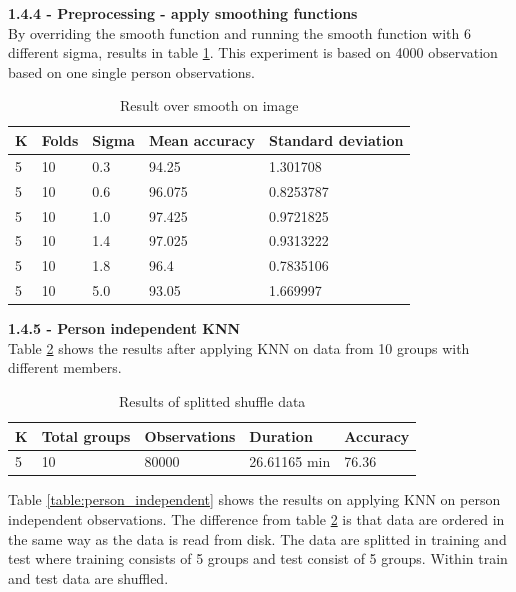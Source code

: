\noindent
\textbf{1.4.4 - Preprocessing - apply smoothing functions}\\

By overriding the smooth function and running the smooth function with 6 different sigma, results in table \ref{table:result_over_smooth_on_image}. This experiment is based on 4000 observation based on one single person observations.  

\begin{table}[H]
\centering
\begin{tabular}{|l|l|l|l|l|}
\hline
K & Folds  & Sigma & Mean accuracy & Standard deviation \\ \hline
5 & 10     & 0.3   & 94.25         & 1.301708           \\ \hline
5 & 10     & 0.6   & 96.075        & 0.8253787          \\ \hline
5 & 10     & 1.0   & 97.425        & 0.9721825          \\ \hline
5 & 10     & 1.4   & 97.025        & 0.9313222          \\ \hline
5 & 10     & 1.8   & 96.4          & 0.7835106          \\ \hline
5 & 10     & 5.0   & 93.05         & 1.669997           \\ \hline
\end{tabular}
\caption{Result over smooth on image}
\label{table:result_over_smooth_on_image}
\end{table}

\noindent
\textbf{1.4.5 - Person independent KNN}\\

Table \ref{table:result_split_by_shuffle_data} shows the results after applying KNN on data from 10 groups with different members.

\begin{table}[H]
\centering
\begin{tabular}{|l|l|l|l|l|}
\hline
K & Total groups & Observations & Duration & Accuracy \\ 
\hline
5 & 10           & 80000                  & 26.61165 min   & 76.36       \\ \hline
\end{tabular}
\caption{Results of splitted shuffle data}
\label{table:result_split_by_shuffle_data}
\end{table}

Table \ref{table:person_independent} shows the results on applying KNN on person independent observations. The difference from table \ref{table:result_split_by_shuffle_data} is that data are ordered in the same way as the data is read from disk. The data are splitted in training and test where training consists of 5 groups and test consist of 5 groups. Within train and test data are shuffled.

